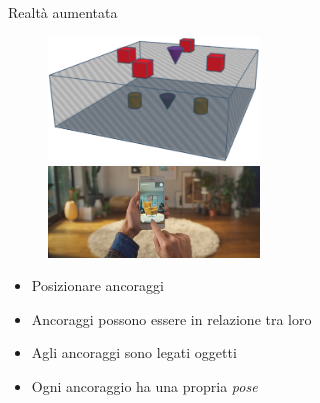 \documentclass{beamer}
\begin{document}

\begin{frame}{Realtà aumentata}

 \begin{figure}
    \centering
    \includegraphics[width=0.5\textwidth]{immagini/ancoraggi_multipiano_crop.png}\vspace{.5em}
    \includegraphics[width=0.5\textwidth]{immagini/ikeaAR.jpg}
\end{figure}
\phantom{A}
\begin{itemize}
    \item Posizionare ancoraggi \vspace{.6em}
    \item Ancoraggi possono essere in relazione tra loro \vspace{.6em}
    \item Agli ancoraggi sono legati oggetti  \vspace{.6em}
    \item Ogni ancoraggio ha una propria \textit{pose} \vspace{.5em}
\end{itemize}
\vspace{3em}
\end{frame}

\end{document}
